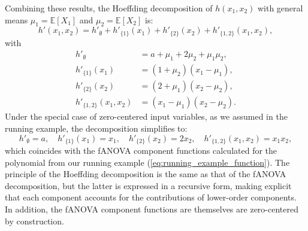 Combining these results, the Hoeffding decomposition of $h(x_1,x_2)$ with general means 
$\mu_1=\mathbb{E}[X_1]$ and $\mu_2=\mathbb{E}[X_2]$ is:
\[
h'(x_1,x_2)
=
h'_{\emptyset} + h'_{\{1\}}(x_1) + h'_{\{2\}}(x_2) + h'_{\{1,2\}}(x_1,x_2),
\]
with
\[
\begin{aligned}
h'_{\emptyset} &= a + \mu_1 + 2\mu_2 + \mu_1\mu_2, \\[0.3em]
h'_{\{1\}}(x_1) &= (1+\mu_2)(x_1 - \mu_1), \\[0.3em]
h'_{\{2\}}(x_2) &= (2+\mu_1)(x_2 - \mu_2), \\[0.3em]
h'_{\{1,2\}}(x_1,x_2) &= (x_1 - \mu_1)(x_2 - \mu_2).
\end{aligned}
\]
Under the special case of zero-centered input variables, as we assumed in the running example, the decomposition simplifies to:
\[
h'_{\emptyset}=a,\quad
h'_{\{1\}}(x_1)=x_1,\quad
h'_{\{2\}}(x_2)=2x_2,\quad
h'_{\{1,2\}}(x_1,x_2)=x_1 x_2,
\]
which coincides with the fANOVA component functions calculated for the polynomial from our running example (\autoref{eq:running_example_function}).
The principle of the Hoeffding decomposition is the same as that of the fANOVA decomposition, but the latter is expressed in a recursive form, making explicit that each component accounts for the contributions of lower-order components.
In addition, the fANOVA component functions are themselves are zero-centered by construction.

